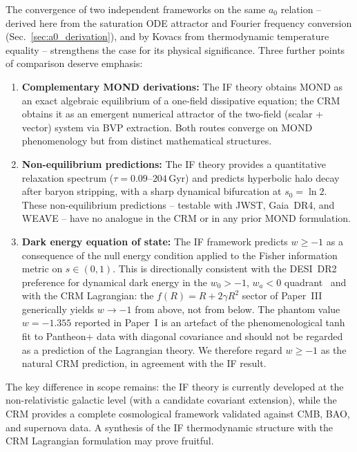 \documentclass[aps,prd,twocolumn,superscriptaddress,nofootinbib]{revtex4-2}
\begin{document}
The convergence of two independent frameworks on the same $a_0$ relation -- derived here from the saturation ODE attractor and Fourier frequency conversion (Sec.~\ref{sec:a0_derivation}), and by Kovacs from thermodynamic temperature equality -- strengthens the case for its physical significance. Three further points of comparison deserve emphasis:

\begin{enumerate}
\item \textbf{Complementary MOND derivations:} The IF theory obtains MOND as an exact algebraic equilibrium of a one-field dissipative equation; the CRM obtains it as an emergent numerical attractor of the two-field (scalar + vector) system via BVP extraction. Both routes converge on MOND phenomenology but from distinct mathematical structures.

\item \textbf{Non-equilibrium predictions:} The IF theory provides a quantitative relaxation spectrum ($\tau = 0.09$--$204$\,Gyr) and predicts hyperbolic halo decay after baryon stripping, with a sharp dynamical bifurcation at $s_0 = \ln 2$. These non-equilibrium predictions -- testable with JWST, Gaia~DR4, and WEAVE -- have no analogue in the CRM or in any prior MOND formulation.

\item \textbf{Dark energy equation of state:} The IF framework predicts $w \geq -1$ as a consequence of the null energy condition applied to the Fisher information metric on $s \in (0,1)$. This is directionally consistent with the DESI~DR2 preference for dynamical dark energy in the $w_0>-1$, $w_a<0$ quadrant~\cite{DESI2025} and with the CRM Lagrangian: the $f(R) = R + 2\gamma R^2$ sector of Paper~III generically yields $w \to -1$ from above, not from below. The phantom value $w = -1.355$ reported in Paper~I is an artefact of the phenomenological tanh fit to Pantheon+ data with diagonal covariance and should not be regarded as a prediction of the Lagrangian theory. We therefore regard $w \geq -1$ as the natural CRM prediction, in agreement with the IF result.
\end{enumerate}

The key difference in scope remains: the IF theory is currently developed at the non-relativistic galactic level (with a candidate covariant extension), while the CRM provides a complete cosmological framework validated against CMB, BAO, and supernova data. A synthesis of the IF thermodynamic structure with the CRM Lagrangian formulation may prove fruitful.
\end{document}
